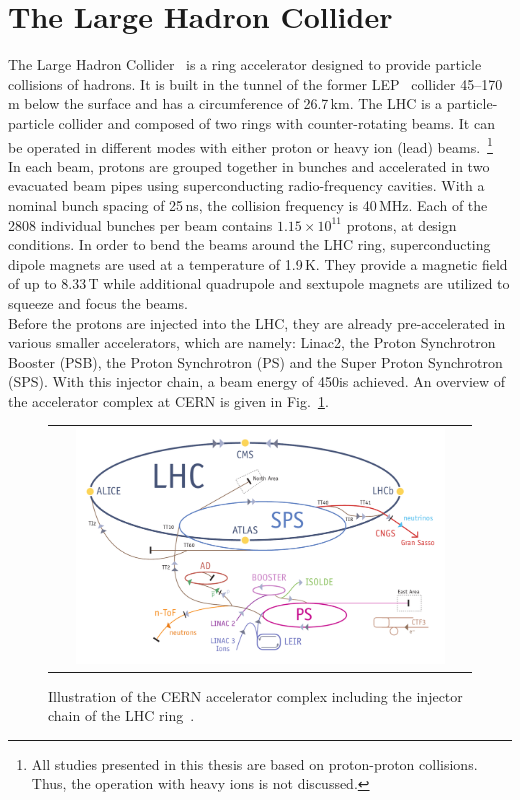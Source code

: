 \section{The Large Hadron Collider}
\label{sec:lhc}
The Large Hadron Collider~\cite{Bruning:782076, 1748-0221-3-08-S08001} is a ring accelerator designed to provide particle collisions of hadrons. It is built in the tunnel of the former LEP~\cite{LEPdesign} collider 45--170\,m below the surface and has a circumference of 26.7\,km. The LHC is a particle-particle collider and composed of two rings with counter-rotating beams. It can be operated in different modes with either proton or heavy ion (\eg lead) beams.~\footnote{All studies presented in this thesis are based on proton-proton collisions. Thus, the operation with heavy ions is not discussed.} \\
In each beam, protons are grouped together in bunches and accelerated in two evacuated beam pipes using superconducting radio-frequency cavities. With a nominal bunch spacing of 25\,ns, the collision frequency is 40\,MHz. Each of the 2808 individual bunches per beam contains $1.15 \times 10^{11}$ protons, at design conditions. In order to bend the beams around the LHC ring, superconducting dipole magnets are used at a temperature of 1.9\,K. They provide a magnetic field of up to 8.33\,T while additional quadrupole and sextupole magnets are utilized to squeeze and focus the beams.\\  
Before the protons are injected into the LHC, they are already pre-accelerated in various smaller accelerators, which are namely: Linac2, the Proton Synchrotron Booster (PSB), the Proton Synchrotron (PS) and the Super Proton Synchrotron (SPS). With this injector chain, a beam energy of 450\gev is achieved. An overview of the accelerator complex at CERN is given in Fig.~\ref{fig:AccComplex}. 
\begin{figure}[!tp]
  \centering 
  \begin{tabular}{c}
    \includegraphics[width=0.9\textwidth]{figures/lhc.pdf}
  \end{tabular}
  \caption{Illustration of the CERN accelerator complex including the injector chain of the LHC ring~\cite{CERNaccelerators}.}
  \label{fig:AccComplex}
\end{figure}
